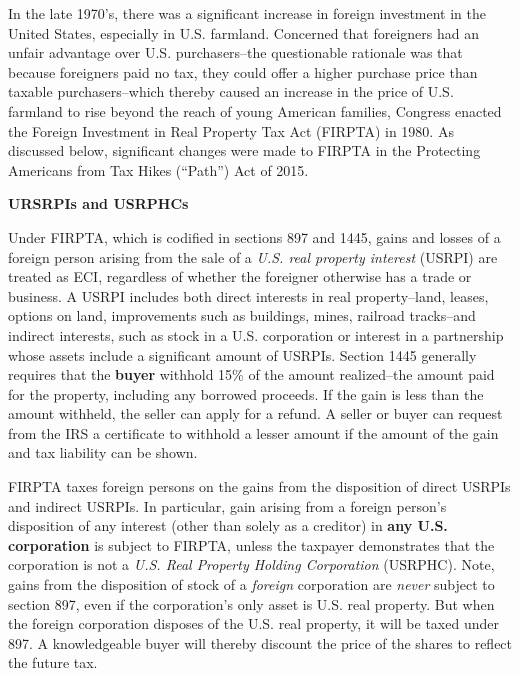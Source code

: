 In the late 1970's, there was a significant increase in foreign investment in the United States, especially in U.S. farmland.  Concerned that foreigners had an unfair advantage over U.S. purchasers--the questionable rationale was that because foreigners paid no tax, they could offer a higher purchase price than taxable purchasers--which thereby caused an increase in the price of U.S. farmland to rise beyond the reach of young American families, Congress enacted the Foreign Investment in Real Property Tax Act (FIRPTA) in 1980.  As discussed below, significant changes were made to FIRPTA in the Protecting Americans from Tax Hikes (``Path'') Act of 2015.

\begin{center}
\textbf{URSRPIs and USRPHCs}
\end{center}

Under FIRPTA, which is codified in sections 897 and 1445, gains and losses of a foreign person arising from the sale of a \emph{U.S. real property interest} (USRPI) are treated as ECI, regardless of whether the foreigner otherwise has a trade or business.  A USRPI includes both direct interests in real property--land, leases, options on land, improvements such as buildings, mines, railroad tracks--and indirect interests, such as stock in a U.S. corporation or interest in a partnership whose assets include a significant amount of USRPIs.  Section 1445 generally requires that the \textbf{buyer} withhold 15\% of the amount realized--the amount paid for the property, including any borrowed proceeds.  If the gain is less than the amount withheld, the seller can apply for a refund.  A seller or buyer can request from the IRS a certificate to withhold a lesser amount if the amount of the gain and tax liability can be shown.     

FIRPTA taxes foreign persons on the gains from the disposition of direct USRPIs and indirect USRPIs.  In particular, gain arising from a foreign person's disposition of any interest (other than solely as a creditor) in \textbf{any U.S. corporation} is subject to FIRPTA, unless the taxpayer demonstrates that the corporation is not a \emph{U.S. Real Property Holding Corporation} (USRPHC).  Note, gains from the disposition of stock of a \emph{foreign} corporation are \emph{never} subject to section 897, even if the corporation's only asset is U.S. real property. But when the foreign corporation disposes of the U.S. real property, it will be taxed under 897.  A knowledgeable buyer will thereby discount the price of the shares to reflect the future tax.

